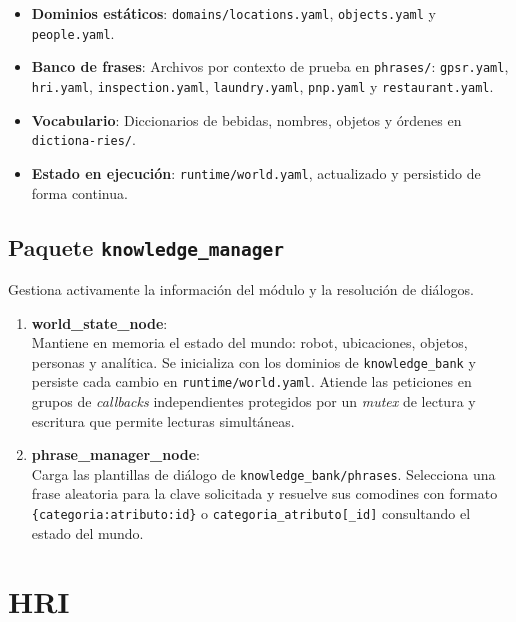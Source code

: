 \begin{itemize}
    \item \textbf{Dominios estáticos}: \texttt{domains/locations.yaml}, \texttt{objects.yaml} y \texttt{people.yaml}.
    \item \textbf{Banco de frases}: Archivos por contexto de prueba en \texttt{phrases/}: \texttt{gpsr.yaml}, \texttt{hri.yaml}, \texttt{inspection.yaml}, \texttt{laundry.yaml}, \texttt{pnp.yaml} y \texttt{restaurant.yaml}.
    \item \textbf{Vocabulario}: Diccionarios de bebidas, nombres, objetos y órdenes en \texttt{dictiona-\allowbreak{}ries/}.
    \item \textbf{Estado en ejecución}: \texttt{runtime/world.yaml}, actualizado y persistido de forma continua.
\end{itemize}

\subsection{Paquete \texttt{knowledge\_manager}}
Gestiona activamente la información del módulo y la resolución de diálogos.

\begin{enumerate}
    \item \textbf{world\_state\_node}: \\
    Mantiene en memoria el estado del mundo: robot, ubicaciones, objetos, personas y analítica. Se inicializa con los dominios de \texttt{knowledge\_bank} y persiste cada cambio en \texttt{runtime/world.yaml}. Atiende las peticiones en grupos de \textit{callbacks} independientes protegidos por un \textit{mutex} de lectura y escritura que permite lecturas simultáneas.

    \item \textbf{phrase\_manager\_node}: \\
    Carga las plantillas de diálogo de \texttt{knowledge\_bank/phrases}. Selecciona una frase aleatoria para la clave solicitada y resuelve sus comodines con formato \texttt{\{categoria:\allowbreak{}atributo:id\}} o \texttt{categoria\_atributo[\_id]} consultando el estado del mundo.
\end{enumerate}


\section[HRI]{HRI}
\label{app:justina_hri}

